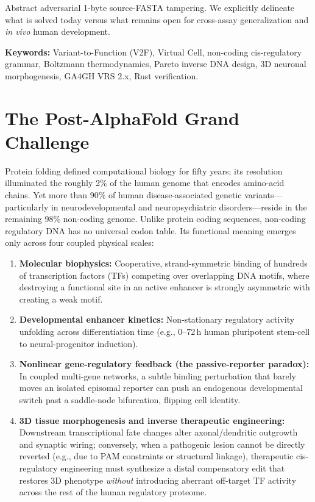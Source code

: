\documentclass[10.5pt,a4paper]{article}
\begin{document}
\begin{abstractbox}{Abstract}
adversarial 1-byte source-FASTA tampering. We explicitly delineate what is solved today versus what remains open for cross-assay generalization and \emph{in vivo} human development.

\smallskip\noindent\textbf{Keywords:} Variant-to-Function (V2F), Virtual Cell, non-coding cis-regulatory grammar, Boltzmann thermodynamics, Pareto inverse DNA design, 3D neuronal morphogenesis, GA4GH VRS 2.x, Rust verification.
\end{abstractbox}

\section{The Post-AlphaFold Grand Challenge}

Protein folding defined computational biology for fifty years; its resolution illuminated the roughly 2\% of the human genome that encodes amino-acid chains. Yet more than 90\% of human disease-associated genetic variants—particularly in neurodevelopmental and neuropsychiatric disorders—reside in the remaining 98\% non-coding genome. Unlike protein coding sequences, non-coding regulatory DNA has no universal codon table. Its functional meaning emerges only across four coupled physical scales:
\begin{enumerate}
\item \textbf{Molecular biophysics:} Cooperative, strand-symmetric binding of hundreds of transcription factors (TFs) competing over overlapping DNA motifs, where destroying a functional site in an active enhancer is strongly asymmetric with creating a weak motif.
\item \textbf{Developmental enhancer kinetics:} Non-stationary regulatory activity unfolding across differentiation time (e.g., 0--72\,h human pluripotent stem-cell to neural-progenitor induction).
\item \textbf{Nonlinear gene-regulatory feedback (the passive-reporter paradox):} In coupled multi-gene networks, a subtle binding perturbation that barely moves an isolated episomal reporter can push an endogenous developmental switch past a saddle-node bifurcation, flipping cell identity.
\item \textbf{3D tissue morphogenesis and inverse therapeutic engineering:} Downstream transcriptional fate changes alter axonal/dendritic outgrowth and synaptic wiring; conversely, when a pathogenic lesion cannot be directly reverted (e.g., due to PAM constraints or structural linkage), therapeutic cis-regulatory engineering must synthesize a distal compensatory edit that restores 3D phenotype \emph{without} introducing aberrant off-target TF activity across the rest of the human regulatory proteome.
\end{enumerate}
\end{document}
